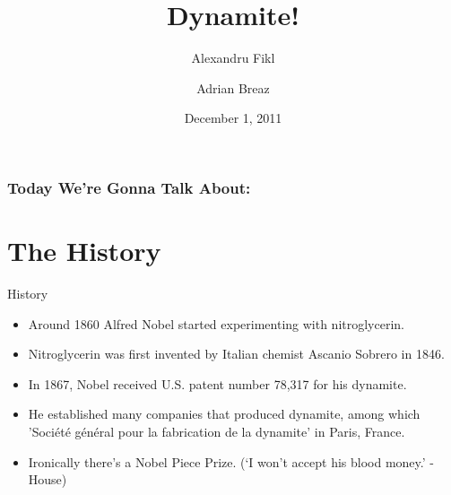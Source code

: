 \documentclass[xcolor=dvipsnames]{beamer}
\title{Dynamite!}
\author{Alexandru Fikl \and Adrian Breaz}
\date{December 1, 2011}
\begin{document}
\begin{frame}
 \titlepage
\end{frame}

\begin{frame}
 \frametitle{Today We're Gonna Talk About:}
 \tableofcontents
\end{frame}

\section{The History}
\begin{frame}{History}
\begin{itemize}
    \item Around 1860 Alfred Nobel started experimenting with nitroglycerin.
	\item Nitroglycerin was first invented by Italian chemist Ascanio Sobrero
in 1846.
	\item In 1867, Nobel received U.S. patent number 78,317 for his dynamite.
	\item He established many companies that produced dynamite, among which 'Soci\'{e}t\'{e}
g\'{e}n\'{e}ral pour la fabrication de la dynamite' in Paris, France.
	\item Ironically there's a Nobel Piece Prize. (`I won't accept his blood money.' - House)
\end{itemize}
\end{frame}
\end{document}

